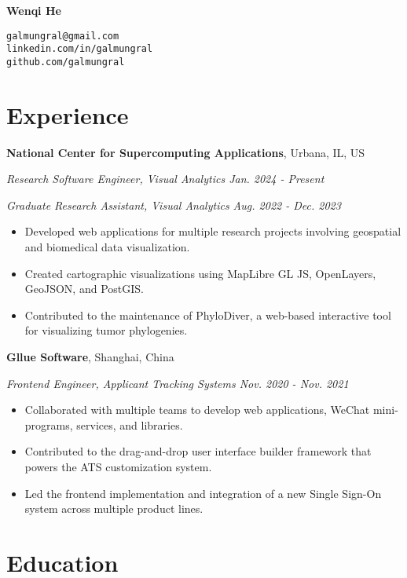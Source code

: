 \documentclass[11pt]{article}
\begin{document}
 

{\Huge\bf Wenqi He}

\vspace{10pt}
\texttt{galmungral@gmail.com}\\
\texttt{linkedin.com/in/galmungral}\\
\texttt{github.com/galmungral}\\

\section*{\sc Experience}

\vspace{1em}
\textbf{National Center for Supercomputing Applications}, Urbana, IL, US

\textit{Research Software Engineer, Visual Analytics \hfill Jan. 2024 - Present}

\textit{Graduate Research Assistant, Visual Analytics \hfill Aug. 2022 - Dec. 2023}

\begin{itemize}
\item Developed web applications for multiple research projects involving geospatial and biomedical data visualization.
\item Created cartographic visualizations using MapLibre GL JS, OpenLayers, GeoJSON, and PostGIS.
\item Contributed to the maintenance of PhyloDiver, a web-based interactive tool for visualizing tumor phylogenies.
\end{itemize}

\vspace{1em}
\textbf{Gllue Software}, Shanghai, China

\textit{Frontend Engineer, Applicant Tracking Systems \hfill Nov. 2020 - Nov. 2021}

\begin{itemize}
\item Collaborated with multiple teams to develop web applications, WeChat mini-programs, services, and libraries.
\item Contributed to the drag-and-drop user interface builder framework that powers the ATS customization system.
\item Led the frontend implementation and integration of a new Single Sign-On system across multiple product lines.
\end{itemize}

\section*{\sc Education}
\end{document}
